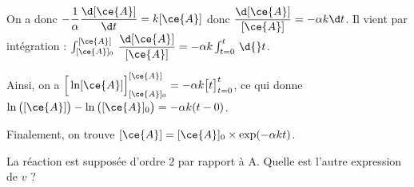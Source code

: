 
\begin{corrige}
On a donc $-\dfrac{1}{\alpha} \dfrac{\d [\ce{A}]}{\d t} = k[\ce{A}]$ donc $\dfrac{\d [\ce{A}]}{[\ce{A}]} = -\alpha k\d t$. Il vient par intégration : $\int_{[\ce{A}]_0}^{[\ce{A}]} \, \dfrac{\d [\ce{A}]}{[\ce{A}]} = -\alpha k\int_{t=0}^{t} \, \d{}t$. 

Ainsi, on a $\Big[\ln[\ce{A}]\Big]_{[\ce{A}]_0}^{[\ce{A}]} = -\alpha k\big[t\big]_{t=0}^t$, ce qui donne $\ln\big ([\ce{A}]\big) - \ln\big ([\ce{A}]_0\big)= -\alpha k(t-0)$.

Finalement, on trouve $[\ce{A}] = [\ce{A}]_0 \times \exp(-\alpha kt)$.
\end{corrige}


\finEntrainement






\hauteurLargeurCadreReponse		{7mm}{4cm}
\initialisationEntrainement

\debutEntrainement


\begin{enonce}
La réaction est supposée d’ordre 2 par rapport à A.
Quelle est l'autre expression de $v$ ?

\end{enonce}

